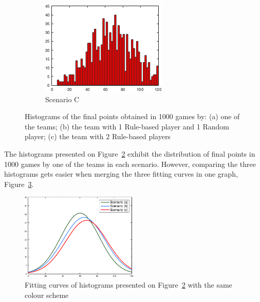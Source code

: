 \begin{figure}[h]
\begin{subfigure}[h]{0.32\textwidth}
                \includegraphics[width=\textwidth]{./img/4/HC-2RuleBased_2Random}
                \caption{Scenario C}
                \label{fig:histogramC}
        \end{subfigure}
        \caption[Histograms of the final points obtained in the 3 scenarios]{Histograms of the final points obtained in 1000 games by: (a) one of the teams; (b) the team with 1 Rule-based player and 1 Random player; (c) the team with 2 Rule-based players}
        \label{fig:histograms}
\end{figure}

The histograms presented on Figure~\ref{fig:histograms} exhibit the distribution of final points in 1000 games by one of the teams in each scenario.
However, comparing the three histograms gets easier when merging the three fitting curves in one graph, Figure~\ref{fig:fitHistABC}.

\begin{figure}[h!]
  \centering
    \includegraphics[width=0.5\textwidth]{./img/4/FitHistABC}
  \caption{Fitting curves of histograms presented on Figure~\ref{fig:histograms} with the same colour scheme}
\label{fig:fitHistABC}
\end{figure}

